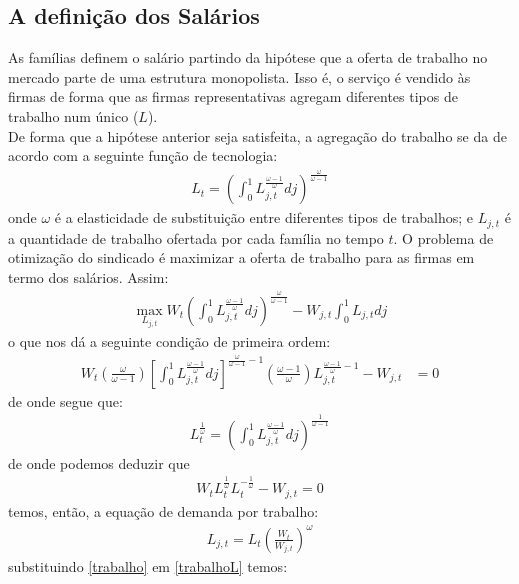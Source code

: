 \documentclass[10pt,a4paper]{article}
\begin{document}
\subsection{A definição dos Salários}

As famílias definem o salário partindo da hipótese  que a oferta de trabalho no mercado parte de uma estrutura monopolista. Isso é, o serviço é vendido às firmas de forma que as firmas representativas agregam diferentes tipos de trabalho num único ($L$).\\

De forma que a hipótese anterior seja satisfeita, a agregação 
do trabalho se da de acordo com a seguinte função de tecnologia:
\begin{align} \label{trabalhoL}
L_t = \left(\int_{0}^{1} L_{j,t}^{\frac{\omega - 1}{\omega}} dj\right)^{\frac{\omega}{\omega - 1}}
\end{align}
\noindent
onde $\omega$ é a elasticidade de substituição entre diferentes tipos de trabalhos; e $L_{j,t}$ é a quantidade de trabalho ofertada por cada família no tempo $t$. O problema de otimização do sindicado é maximizar a oferta de trabalho para as firmas em termo dos salários. Assim:
\begin{align*}
\max_{L_{j,t}}W_t\left(\int_{0}^{1} L_{j,t}^{\frac{\omega - 1}{\omega}} dj\right)^{\frac{\omega}{\omega - 1}} - W_{j,t}\int_{0}^{1}L_{j,t}dj
\end{align*}
\noindent
o que nos dá a seguinte condição de primeira ordem:
\begin{align*}
W_t\left(\frac{\omega}{\omega - 1}\right)\left[\int_{0}^{1} L_{j,t}^{\frac{\omega - 1}{\omega}} dj\right]^{\frac{\omega}{\omega - 1} - 1}\left(\frac{\omega - 1}{\omega}\right)L_{j,t}^{\frac{\omega - 1}{\omega} - 1} - W_{j,t} &= 0
\end{align*}
\noindent
de onde segue que:
\begin{align}
L_{t}^{\frac{1}{\omega}} = \left(\int_{0}^{1} L_{j,t}^{\frac{\omega - 1}{\omega}} dj\right)^{\frac{1}{\omega - 1}}
\end{align}
\noindent
de onde podemos deduzir que 
\begin{align*}
W_{t}L_{t}^{\frac{1}{\omega}}L_{t}^{-\frac{1}{\omega}} - W_{j,t} = 0
\end{align*}
\noindent
temos, então, a equação de demanda por trabalho:
\begin{align}\label{trabalho}
L_{j,t} = L_t \left(\frac{W_t}{W_{j,t}}\right)^{\omega}
\end{align}
\noindent
substituindo \ref{trabalho} em \ref{trabalhoL} temos:
\end{document}
